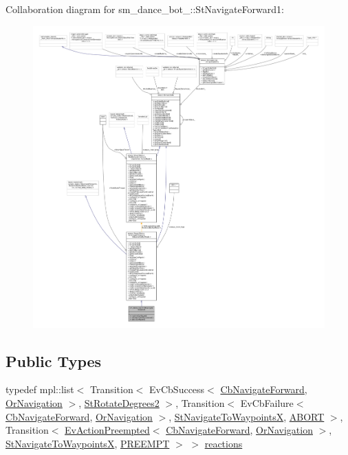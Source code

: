 Collaboration diagram for sm\+\_\+dance\+\_\+bot\+\_\+:\+:St\+Navigate\+Forward1\+:
\nopagebreak
\begin{figure}[H]
\begin{center}
\leavevmode
\includegraphics[width=350pt]{structsm__dance__bot__2_1_1StNavigateForward1__coll__graph}
\end{center}
\end{figure}
\subsection*{Public Types}
\begin{DoxyCompactItemize}
\item 
typedef mpl\+::list$<$ Transition$<$ Ev\+Cb\+Success$<$ \hyperlink{classcl__move__base__z_1_1CbNavigateForward}{Cb\+Navigate\+Forward}, \hyperlink{classsm__dance__bot__2_1_1OrNavigation}{Or\+Navigation} $>$, \hyperlink{structsm__dance__bot__2_1_1StRotateDegrees2}{St\+Rotate\+Degrees2} $>$, Transition$<$ Ev\+Cb\+Failure$<$ \hyperlink{classcl__move__base__z_1_1CbNavigateForward}{Cb\+Navigate\+Forward}, \hyperlink{classsm__dance__bot__2_1_1OrNavigation}{Or\+Navigation} $>$, \hyperlink{structsm__dance__bot__2_1_1StNavigateToWaypointsX}{St\+Navigate\+To\+WaypointsX}, \hyperlink{structsmacc_1_1default__transition__tags_1_1ABORT}{A\+B\+O\+RT} $>$, Transition$<$ \hyperlink{structsmacc_1_1default__events_1_1EvActionPreempted}{Ev\+Action\+Preempted}$<$ \hyperlink{classcl__move__base__z_1_1CbNavigateForward}{Cb\+Navigate\+Forward}, \hyperlink{classsm__dance__bot__2_1_1OrNavigation}{Or\+Navigation} $>$, \hyperlink{structsm__dance__bot__2_1_1StNavigateToWaypointsX}{St\+Navigate\+To\+WaypointsX}, \hyperlink{structsmacc_1_1default__transition__tags_1_1PREEMPT}{P\+R\+E\+E\+M\+PT} $>$ $>$ \hyperlink{structsm__dance__bot__2_1_1StNavigateForward1_ad3a42f210e6afa69c006cf9c06329297}{reactions}
\end{DoxyCompactItemize}
